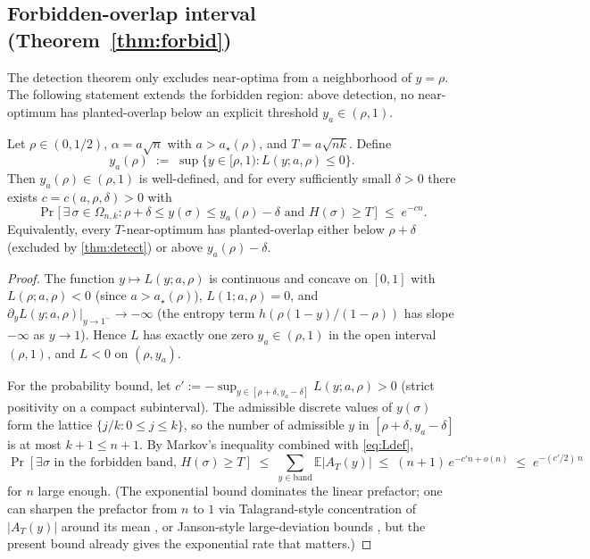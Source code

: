 \subsection{Forbidden-overlap interval (Theorem~\ref{thm:forbid})}

The detection theorem only excludes near-optima from a neighborhood of $y=\rho$. The
following statement extends the forbidden region: above detection, no near-optimum has
planted-overlap below an explicit threshold $y_a\in(\rho,1)$.

\begin{theorem}\label{thm:forbid}
Let $\rho\in(0,1/2)$, $\alpha=a\sqrt n$ with $a > a_\star(\rho)$, and $T = a\sqrt{nk}$. Define
\begin{equation}\label{eq:ya}
y_a(\rho) \;:=\; \sup\bigl\{y\in[\rho,1) : L(y;a,\rho) \leq 0\bigr\}.
\end{equation}
Then $y_a(\rho)\in(\rho, 1)$ is well-defined, and for every sufficiently small $\delta>0$
there exists $c=c(a,\rho,\delta)>0$ with
\begin{equation}\label{eq:forbid}
\Pr\bigl[\,\exists\,\sigma\in\Omega_{n,k} : \rho+\delta \le y(\sigma) \le y_a(\rho) - \delta
\text{ and } H(\sigma) \ge T\,\bigr] \;\le\; e^{-c n}.
\end{equation}
Equivalently, every $T$-near-optimum has planted-overlap either below $\rho+\delta$
(excluded by \cref{thm:detect}) or above $y_a(\rho)-\delta$.
\end{theorem}
\begin{proof}
The function $y\mapsto L(y;a,\rho)$ is continuous and concave on $[0,1]$ with
$L(\rho;a,\rho)<0$ (since $a > a_\star(\rho)$), $L(1;a,\rho) = 0$, and
$\partial_y L(y;a,\rho)\big|_{y\to 1^-}\to-\infty$ (the entropy term $h(\rho(1-y)/(1-\rho))$
has slope $-\infty$ as $y\to 1$). Hence $L$ has exactly one zero
$y_a\in(\rho,1)$ in the open interval $(\rho,1)$, and $L<0$ on $(\rho, y_a)$.

For the probability bound, let $c' := -\sup_{y\in[\rho+\delta, y_a-\delta]} L(y;a,\rho) > 0$
(strict positivity on a compact subinterval). The admissible discrete values of
$y(\sigma)$ form the lattice $\{j/k : 0\le j\le k\}$, so the number of admissible $y$ in
$[\rho+\delta,y_a-\delta]$ is at most $k+1\le n+1$. By Markov's inequality combined with
\eqref{eq:Ldef},
\begin{equation}\label{eq:union}
\Pr[\exists\sigma\text{ in the forbidden band, } H(\sigma)\ge T]
  \;\le\; \sum_{y\in\text{band}} \mathbb E|A_T(y)|
  \;\le\; (n+1)\,e^{-c' n + o(n)}
  \;\le\; e^{-(c'/2)\,n}
\end{equation}
for $n$ large enough. (The exponential bound dominates the linear prefactor; one can
sharpen the prefactor from $n$ to $1$ via Talagrand-style concentration of $|A_T(y)|$
around its mean \cite{talagrand-concentration}, or Janson-style large-deviation bounds
\cite{janson}, but the present bound already gives the exponential rate that matters.)
\end{proof}


